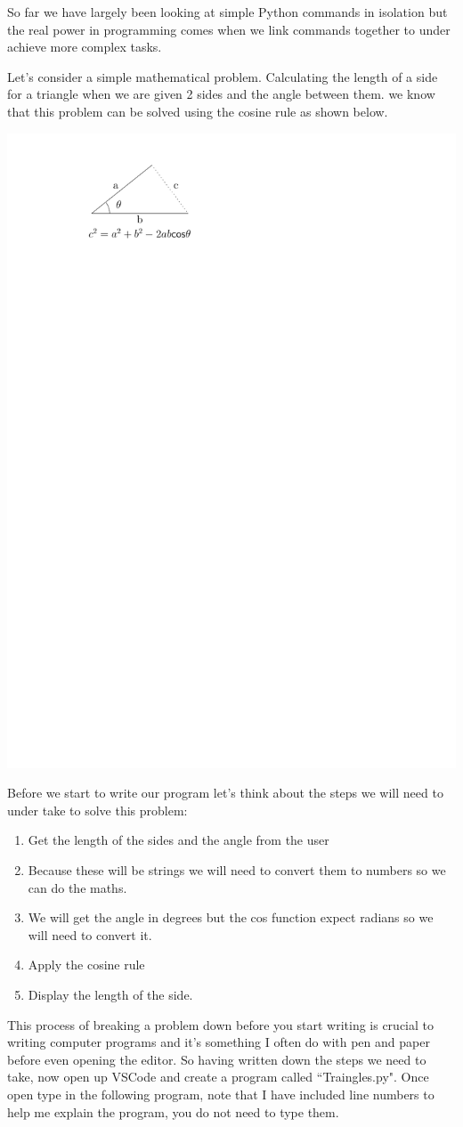 So far we have largely been looking at simple Python commands in isolation but the real power in programming comes when we link commands together to under achieve more complex tasks.

Let's consider a simple mathematical problem. Calculating the length of a side for a triangle when we are given 2 sides and the angle between them. we know that this problem can be solved using the cosine rule as shown below. 



    \begin{center}
        \includegraphics[width=0.3\linewidth]{images/cosineRule.pdf}
    \end{center}

Before we start to write our program let's think about the steps we will need to under take to solve this problem:
\begin{enumerate}
\item Get the length of the sides and the angle from the user
\item Because these will be strings we will need to convert them to numbers so we can do the maths.
\item We will get the angle in degrees but the cos function expect radians so we will need to convert it.
\item Apply the cosine rule
\item Display the length of the side.
\end{enumerate}

This process of breaking a problem down before you start writing is crucial to writing computer programs and it's something I often do with pen and paper before even opening the editor. So having written down the steps we need to take, now open up VSCode and create a program called ``Traingles.py". Once open type in the following program, note that I have included line numbers to help me explain the program, you do not need to type them.

